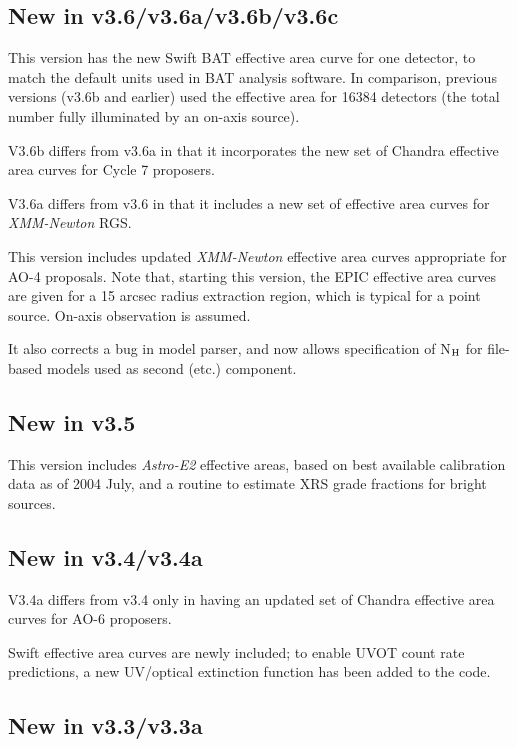 \documentclass[11pt]{article}
\begin{document}
\begin{appendices}
\subsection{New in v3.6/v3.6a/v3.6b/v3.6c}

This version has the new Swift BAT effective area curve for one detector,
to match the default units used in BAT analysis software.  In comparison,
previous versions (v3.6b and earlier) used the effective area for 16384
detectors (the total number fully illuminated by an on-axis source).

V3.6b differs from v3.6a in that it incorporates the new set of Chandra
effective area curves for Cycle 7 proposers.

V3.6a differs from v3.6 in that it includes a new set of effective
area curves for {\em XMM-Newton\/} RGS.

This version includes updated {\em XMM-Newton\/} effective area curves
appropriate for AO-4 proposals.  Note that, starting this version, the
EPIC effective area curves are given for a 15 arcsec radius extraction
region, which is typical for a point source.  On-axis observation is
assumed.

It also corrects a bug in model parser, and now allows specification
of N$_{\rm H}$ for file-based models used as second (etc.) component.

\subsection{New in v3.5}

This version includes {\em Astro-E2\/} effective areas, based on best available
calibration data as of 2004 July, and a routine to estimate XRS grade
fractions for bright sources.

\subsection{New in v3.4/v3.4a}

V3.4a differs from v3.4 only in having an updated set of Chandra
effective area curves for AO-6 proposers.

Swift effective area curves are newly included; to enable UVOT
count rate predictions, a new UV/optical extinction function has
been added to the code.

\subsection{New in v3.3/v3.3a}


\end{appendices}
\end{document}

